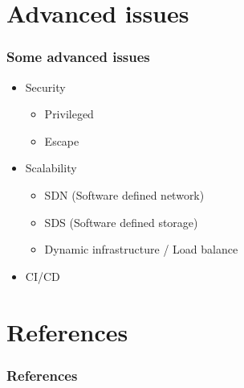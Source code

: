 \documentclass{beamer}
\begin{document}
\section{Advanced issues}
\begin{frame}
    \frametitle{Some advanced issues}
    \begin{itemize}
        \item Security
              \begin{itemize}
                  \item Privileged
                  \item Escape
              \end{itemize}
        \item Scalability
              \begin{itemize}
                  \item SDN (Software defined network)
                  \item SDS (Software defined storage)
                  \item Dynamic infrastructure / Load balance
              \end{itemize}
        \item CI/CD
    \end{itemize}
\end{frame}


\section{References}
\begin{frame}[t, allowframebreaks]
    \frametitle{References}
    \renewcommand*{\bibfont}{\scriptsize}
    \printbibliography
\end{frame}
\end{document}
